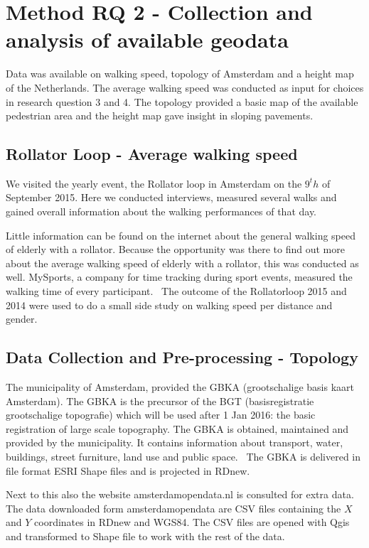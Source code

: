 \section{Method RQ 2 - Collection and analysis of available geodata}\label{rq2a}
Data was available on walking speed, topology of Amsterdam and a height map of the Netherlands. The average walking speed was conducted as input for choices in research question 3 and 4. The topology provided a basic map of the available pedestrian area and the height map gave insight in sloping pavements. 

\subsection{Rollator Loop - Average walking speed}
We visited the yearly event, the Rollator loop in Amsterdam on the $9^th$ of September 2015. Here we conducted interviews, measured several walks and gained overall information about the walking performances of that day. 

Little information can be found on the internet about the general walking speed of elderly with a rollator. Because the opportunity was there to find out more about the average walking speed of elderly with a rollator, this was conducted as well. MySports, a company for time tracking during sport events, measured the walking time of every participant.~\cite{mysports} The outcome of the Rollatorloop 2015 and 2014 were used to do a small side study on walking speed per distance and gender. 

\subsection{Data Collection and Pre-processing - Topology }
The municipality of Amsterdam, provided the GBKA (grootschalige basis kaart Amsterdam). The GBKA is the precursor of the BGT (basisregistratie grootschalige topografie) which will be used after 1 Jan 2016: the basic registration of large scale topography. The GBKA is obtained, maintained and provided by the municipality. It contains information about transport, water, buildings, street furniture, land use and public space.~\cite{gbka} The GBKA is delivered in file format ESRI Shape files and is projected in RDnew. 

Next to this also the website amsterdamopendata.nl is consulted for extra data.~\cite{opendata} The data downloaded form amsterdamopendata are CSV files containing the $X$ and $Y$ coordinates in RDnew and WGS84. The CSV files are opened with Qgis and transformed to Shape file to work with the rest of the data. 

